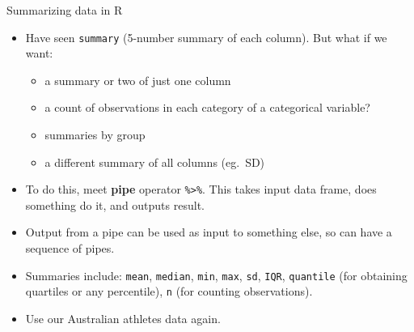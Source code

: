 \documentclass[unknownkeysallowed]{beamer}\usepackage[]{graphicx}\usepackage[]{color}
\begin{document}
\begin{frame}[fragile]{Summarizing data in R}


  
  \begin{itemize}
  \item Have seen \texttt{summary} (5-number summary of each
    column). But what if we want:
    
    \begin{itemize}
    \item a summary or two of just one column
    \item a count of observations in each category of a categorical
      variable? 
    \item summaries by group
    \item a different summary of all columns (eg.\ SD)
    \end{itemize}
    
  \item To do this, meet \textbf{pipe} operator \texttt{\%>\%}. This
    takes input data frame, does something do it, and outputs result.
  \item Output from a pipe can be used as input to something else, so
    can have a sequence of pipes.
  \item Summaries include: \texttt{mean}, \texttt{median},
    \texttt{min}, \texttt{max},
    \texttt{sd}, \texttt{IQR}, \texttt{quantile} (for obtaining
    quartiles or any percentile), \texttt{n} (for counting
    observations). 
  \item Use our Australian athletes data again.
  \end{itemize}
  
\end{frame}
\end{document}
